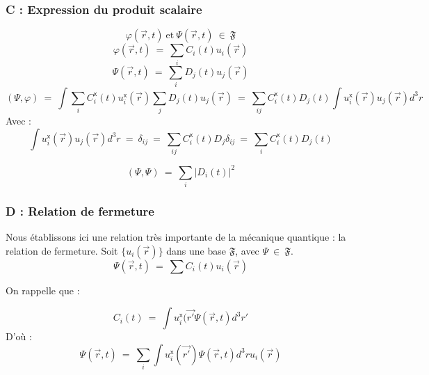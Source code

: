 \documentclass[12pt,a4paper,titlepage]{book}
\begin{document}
\subsubsection{C : Expression du produit scalaire}

\begin{equation*}
\varphi (\overrightarrow{r}, t) ~\text{et}~ \Psi (\overrightarrow{r}, t) ~\in~ \mathfrak{F}
\end{equation*}
\begin{equation*}
\varphi (\overrightarrow{r}, t) ~=~ \sum\limits_{i} C_i (t) u_i (\overrightarrow{r})
\end{equation*}
\begin{equation*}
\Psi (\overrightarrow{r}, t) ~=~ \sum\limits_{i} D_j (t) u_j (\overrightarrow{r})
\end{equation*}
\begin{equation*}
(\Psi, \varphi) ~=~ \int \sum\limits_{i} C_i^{\mathsf{x}} (t) u_i^{\mathsf{x}} (\overrightarrow{r}) \sum\limits_{j} D_j (t) u_j (\overrightarrow{r}) ~=~ \sum\limits_{ij} C_i^{\mathsf{x}} (t) D_j (t) \int u_i^{\mathsf{x}} (\overrightarrow{r}) u_j (\overrightarrow{r}) d^3 r
\end{equation*}
Avec :\\
\begin{equation*}
\int u_i^{\mathsf{x}} (\overrightarrow{r}) u_j (\overrightarrow{r}) d^3 r ~=~ \delta_{ij} ~=~ \sum\limits_{ij} C_i^{\mathsf{x}} (t) D_j \delta_{ij} ~=~ \sum\limits_{i} C_i^{\mathsf{x}} (t) D_j (t)
\end{equation*}

\begin{equation*}
(\Psi, \Psi) ~=~ \sum\limits_{i} \vert D_i (t) \vert ^2
\end{equation*}

\subsubsection{D : Relation de fermeture}

Nous établissons ici une relation très importante de la mécanique quantique : la relation de fermeture. Soit $\lbrace u_i (\overrightarrow{r}) \rbrace$ dans une base $\mathfrak{F}$, avec $\Psi ~\in~ \mathfrak{F}$.
\begin{equation*}
\Psi (\overrightarrow{r}, t) ~=~ \sum C_i (t) u_i (\overrightarrow{r})
\end{equation*}

On rappelle que :

\begin{equation*}
C_i (t) ~=~ \int u_i^{\mathsf{x}} (\overrightarrow{r'} \Psi (\overrightarrow{r}, t) d^3 r'
\end{equation*}
D'où :
\begin{equation*}
\Psi (\overrightarrow{r}, t) ~=~ \sum\limits_i \int u_i^{\mathsf{x}} (\overrightarrow{r'}) \Psi (\overrightarrow{r}, t) d^3 r u_i (\overrightarrow{r})
\end{equation*}
\end{document}
